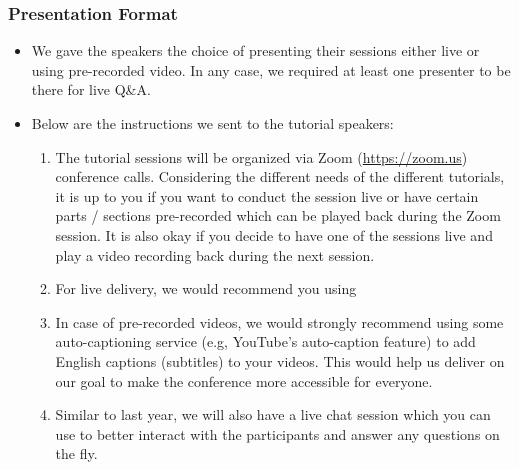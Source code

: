 \documentclass[%
10pt,								%
titlepage,						%
]
{scrartcl}
\begin{document}
        \subsubsection{Presentation Format}
            \begin{itemize}
                \item We gave the speakers the choice of presenting their sessions either live or using pre-recorded video.  In any case, we required at least one presenter to be there for live Q\&A.


                \item   Below are the instructions we sent to the tutorial speakers:
                    \begin{enumerate}
                        \item The tutorial sessions will be organized via Zoom (\href{https://zoom.us}{https://zoom.us}) conference calls. Considering the different needs of the different tutorials, it is up to you if you want to conduct the session live or have certain parts / sections pre-recorded which can be played back during the Zoom session. It is also okay if you decide to have one of the sessions live and play a video recording back during the next session.                  
                        \item   For live delivery, we would recommend you using 
                        \item   In case of pre-recorded videos, we would strongly recommend using some auto-captioning service (e.g, YouTube's auto-caption feature) to add English captions (subtitles) to your videos. This would help us deliver on our goal to make the conference more accessible for everyone.
                        \item   Similar to last year, we will also have a live chat session which you can use to better interact with the participants and answer any questions on the fly.
                    \end{enumerate}
            \end{itemize}
          
\end{document}
